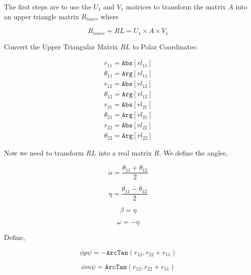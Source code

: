 The first steps are to use the $U_1$ and $V_1$ matrices to transform the matrix $A$ into an upper triangle matrix $R_{lower}$ where


\begin{equation}
R_{lower}=RL=U_1\times A \times V_1
\end{equation}

Convert the Upper Triangular Matrix $RL$ to Polar Coordinates:


\begin{equation}\label{test}
\begin{array}{c}
  r_{11}=\texttt{Abs}[rl_{11}] \\
  \theta _{11}=\texttt{Arg}[rl_{11}] \\
  r_{12}=\texttt{Abs}[rl_{12}] \\
  \theta_{12}=\texttt{Arg}[rl_{12}] \\
  r_{21}=\texttt{Abs}[rl_{21}] \\
  \theta_{21}=\texttt{Arg}[rl_{21}] \\
  r_{22}=\texttt{Abs}[rl_{22}] \\
  \theta_{22}=\texttt{Arg}[rl_{22}]
\end{array}
\end{equation}


Now we need to transform $RL$ into a real matrix $R$. We define the angles,


\begin{equation}
\alpha=\frac{\theta_{11}+\theta_{12}}{2}
\end{equation}



\begin{equation}
\eta=\frac{\theta_{11}-\theta_{12}}{2}
\end{equation}

\begin{equation}
\beta=\eta
\end{equation}

\begin{equation}
\omega =-\eta
\end{equation}

Define,

\begin{equation}
\phi p \psi =-\texttt{ArcTan}( r_{12}, r_{22}+r_{11})
\end{equation}

\begin{equation}
\phi m \psi =\texttt{ArcTan}( r_{12}, r_{22}+r_{11})
\end{equation}

